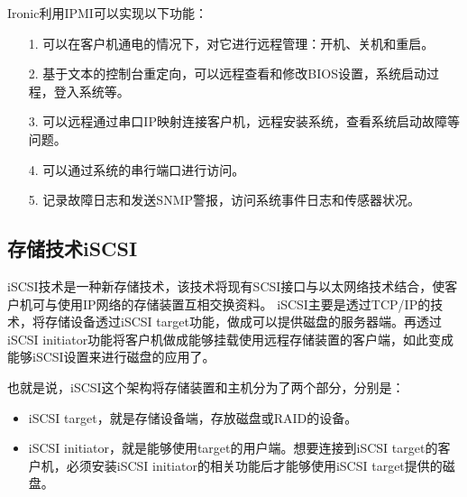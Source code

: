 \documentclass[a4paper,left=1.5cm,right=1.5cm,11pt]{article}
\begin{document}
	Ironic利用IPMI可以实现以下功能：
	\begin{itemize}
		\item[1.] 可以在客户机通电的情况下，对它进行远程管理：开机、关机和重启。
		\item[2.] 基于文本的控制台重定向，可以远程查看和修改BIOS设置，系统启动过程，登入系统等。
		\item[3.] 可以远程通过串口IP映射连接客户机，远程安装系统，查看系统启动故障等问题。
		\item[4.] 可以通过系统的串行端口进行访问。
		\item[5.] 记录故障日志和发送SNMP警报，访问系统事件日志和传感器状况。
	\end{itemize}

\subsection{存储技术iSCSI}
	iSCSI技术是一种新存储技术，该技术将现有SCSI接口与以太网络技术结合，使客户机可与使用IP网络的存储装置互相交换资料。
	iSCSI主要是透过TCP/IP的技术，将存储设备透过iSCSI target功能，做成可以提供磁盘的服务器端。再透过iSCSI initiator功能将客户机做成能够挂载使用远程存储装置的客户端，如此变成能够iSCSI设置来进行磁盘的应用了。\par

	也就是说，iSCSI这个架构将存储装置和主机分为了两个部分，分别是：
	\begin{itemize}
		\item iSCSI target，就是存储设备端，存放磁盘或RAID的设备。
		\item iSCSI initiator，就是能够使用target的用户端。想要连接到iSCSI target的客户机，必须安装iSCSI initiator的相关功能后才能够使用iSCSI target提供的磁盘。
	\end{itemize}
\end{document}
